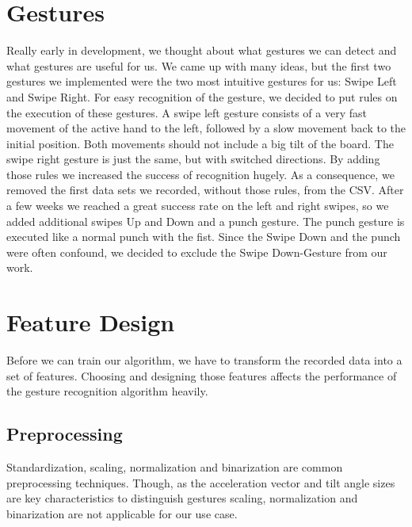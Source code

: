 \section{Gestures}
\label{ch:DataCollection:sec:Gestures}

Really early in development, we thought about what gestures we can detect and what gestures are useful for us.
We came up with many ideas, but the first two gestures we implemented were the two most intuitive gestures for us: Swipe Left and Swipe Right.
For easy recognition of the gesture, we decided to put rules on the execution of these gestures.
A \glqq swipe left\grqq{} gesture consists of a very fast movement of the active hand to the left, followed by a slow movement back to the initial position.
Both movements should not include a big tilt of the board.
The \glqq swipe right\grqq{} gesture is just the same, but with switched directions.
By adding those rules we increased the success of recognition hugely.
As a consequence, we removed the first data sets we recorded, without those rules, from the CSV.
After a few weeks we reached a great success rate on the left and right swipes, so we added additional swipes \glqq Up\grqq{} and \glqq Down\grqq{} and a punch gesture.
The punch gesture is executed like a normal punch with the fist.
Since the \glqq Swipe Down\grqq{} and the punch were often confound, we decided to exclude the \glqq Swipe Down\grqq -Gesture from our work.

\section{Feature Design}
\label{ch:DataCollection:sec:FeatureDesign}

Before we can train our algorithm, we  have to transform the recorded data into a set  of  features.
Choosing  and  designing  those  features  affects  the  performance  of  the gesture recognition algorithm heavily.

\subsection{Preprocessing}
\label{ch:DataCollection:sec:FeatureDesign:sub:Preprocessing}

Standardization,     scaling,     normalization     and     binarization     are     common preprocessing techniques.
Though, as the acceleration vector and tilt angle sizes are key characteristics  to  distinguish  gestures  scaling,  normalization  and  binarization  are  not applicable for our use case. 

